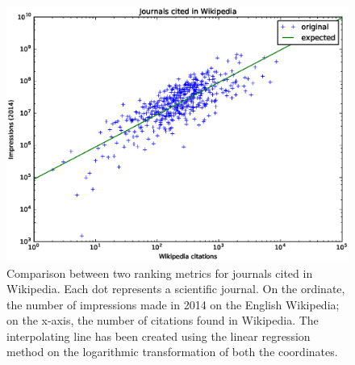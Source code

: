 \begin{figure}[h]
\centering
\includegraphics[keepaspectratio=true, width=\textwidth]{assets/journals_appearances_impressions_loglog}
\caption{Comparison between two ranking metrics for journals cited in Wikipedia.
Each dot represents a scientific journal.
On the ordinate, the number of impressions made in 2014 on the English Wikipedia;
on the x-axis, the number of citations found in Wikipedia.
The interpolating line has been created using the linear regression method on the logarithmic transformation of both the coordinates.}
\label{fig:journals_appearances_impressions_loglog}
\end{figure}


